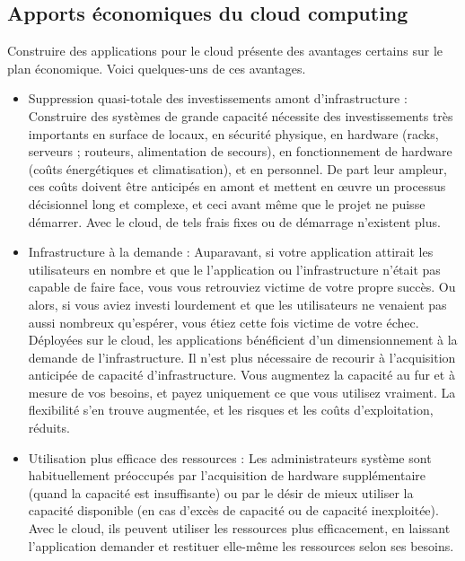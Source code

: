 \documentclass[a4paper, 12pt]{report}
\begin{document}
\begin{itemize}
\subsection{	Apports économiques du cloud computing }
Construire des applications pour le cloud présente des avantages certains sur le plan économique. Voici quelques-uns de ces avantages. 
\begin{itemize}
	\item 	Suppression quasi-totale des investissements amont d'infrastructure : Construire des systèmes de grande capacité nécessite des investissements très importants en surface de locaux, en sécurité physique, en hardware (racks, serveurs ; routeurs, alimentation de secours), en fonctionnement de hardware (coûts énergétiques et climatisation), et en personnel. De part leur ampleur, ces coûts doivent être anticipés en amont et mettent en œuvre un processus décisionnel long et complexe, et ceci avant même que le projet ne puisse démarrer. Avec le cloud, de tels frais fixes ou de démarrage n'existent plus. 
 
\item	Infrastructure à la demande : Auparavant, si votre application attirait les utilisateurs en nombre et que le l'application ou l'infrastructure n'était pas capable de faire face, vous vous retrouviez victime de votre propre succès. Ou alors, si vous aviez investi lourdement et que les utilisateurs ne venaient pas aussi nombreux qu'espérer, vous étiez cette fois victime de votre échec. Déployées sur le cloud, les applications bénéficient d'un dimensionnement à la demande de l'infrastructure. Il n'est plus nécessaire de recourir à l'acquisition anticipée de capacité d'infrastructure. Vous augmentez la capacité au fur et à mesure de vos besoins, et payez uniquement ce que vous utilisez vraiment. La flexibilité s'en trouve augmentée, et les risques et les coûts d'exploitation, réduits. 
 
\item Utilisation plus efficace des ressources : Les administrateurs système sont habituellement préoccupés par l'acquisition de hardware supplémentaire (quand la capacité est insuffisante) ou par le désir de mieux utiliser la capacité disponible (en cas d'excès de capacité ou de capacité inexploitée). Avec le cloud, ils peuvent utiliser les ressources plus efficacement, en laissant l'application demander et restituer elle-même les ressources selon ses besoins. 
 

\end{itemize}
\end{itemize}
\end{document}

